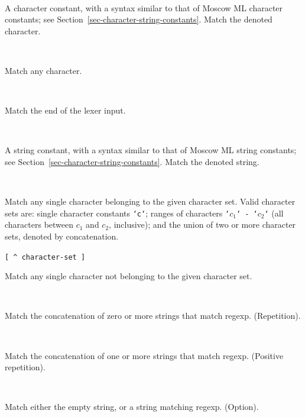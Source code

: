 \documentclass[fleqn,a4paper]{article}
\begin{document}
\begin{description}
\item[{\tt `{\rm char}`}]\mbox{ }

  A character constant, with a syntax similar to that of Moscow ML
  character constants; see Section~\ref{sec-character-string-constants}.
  Match the denoted character.

\item[{\tt \_}]\mbox{ }

   Match any character.

\item[{\tt eof}]\mbox{ }

  Match the end of the lexer input.

\item[{\tt "{\rm string}"}]\mbox{ }
  
  A string constant, with a syntax similar to that of Moscow ML string
  constants; see Section~\ref{sec-character-string-constants}.  Match
  the denoted string.

\item[{\tt [ {\rm character-set} ]}]\mbox{ }

  Match any single character belonging to the given character set.
  Valid character sets are: single character constants {\tt `c`};
  ranges of characters {\tt `$c_1$` - `$c_2$`} (all characters between
  $c_1$ and $c_2$, inclusive); and the union of two or more character
  sets, denoted by concatenation.

\item{{\tt [ \verb#^# {\rm character-set} ]}}\mbox{ }

  Match any single character not belonging to the given character set.

\item[{\tt {\rm regexp} *}]\mbox{ }

  Match the concatenation of zero or more strings that match regexp.
  (Repetition).

\item[{\tt {\rm regexp} +}]\mbox{ }

  Match the concatenation of one or more strings that match regexp.
  (Positive repetition).

\item[{\tt {\rm regexp} ?}]\mbox{ }

  Match either the empty string, or a string matching regexp.
  (Option).

\item[{\tt {\rm regexp}$_1$ | {\rm regexp}$_2$}]\mbox{ }


\end{description}
\end{document}
